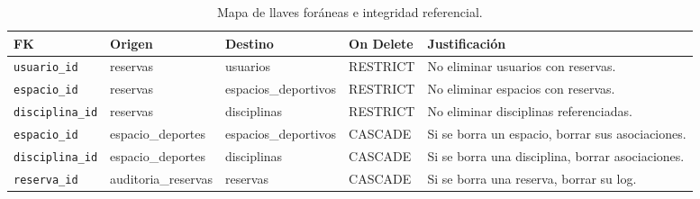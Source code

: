 \documentclass[12pt, a4paper]{article}
\begin{document}
\begin{table}[H]
\centering
\renewcommand{\arraystretch}{1.3}
\begin{tabularx}{\textwidth}{l l l l X}
    \toprule
    \textbf{FK} & \textbf{Origen} & \textbf{Destino} & \textbf{On Delete} & \textbf{Justificación} \\
    \midrule
    \texttt{usuario\_id}    & reservas            & usuarios              & RESTRICT & No eliminar usuarios con reservas. \\
    \texttt{espacio\_id}    & reservas            & espacios\_deportivos  & RESTRICT & No eliminar espacios con reservas. \\
    \texttt{disciplina\_id} & reservas            & disciplinas           & RESTRICT & No eliminar disciplinas referenciadas. \\
    \texttt{espacio\_id}    & espacio\_deportes   & espacios\_deportivos  & CASCADE  & Si se borra un espacio, borrar sus asociaciones. \\
    \texttt{disciplina\_id} & espacio\_deportes   & disciplinas           & CASCADE  & Si se borra una disciplina, borrar asociaciones. \\
    \texttt{reserva\_id}    & auditoria\_reservas & reservas              & CASCADE  & Si se borra una reserva, borrar su log. \\
    \bottomrule
\end{tabularx}
\caption{Mapa de llaves foráneas e integridad referencial.}
\end{table}
\end{document}
